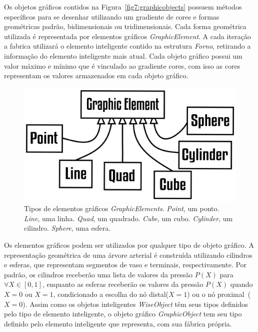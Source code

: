 Os objetos gráficos contidos na Figura~\ref{fig7:graphicobjects} possuem métodos específicos para se desenhar utilizando um gradiente de cores e formas geométricas padrão, bidimensionais ou tridimensionais. Cada forma geométrica utilizada é representada por elementos gráficos \textit{GraphicElement}. A cada iteração  a fabrica utilizará o elemento inteligente contido na estrutura \textit{Forno}, retirando a informação do elemento inteligente mais atual. Cada objeto gráfico possui um valor máximo e mínimo que é vinculado ao gradiente cores, com isso as cores representam os valores armazenados em cada objeto gráfico.

\begin{figure}[!htbp]
	\centering
	\includegraphics[scale=2]{Figures/GraphicElements@16x.png}
	\caption{Tipos de elementos gráficos \textit{GraphicElements}. \textit{Point}, um ponto. \textit{Line}, uma linha. \textit{Quad}, um quadrado. \textit{Cube}, um cubo. \textit{Cylinder}, um cilindro. \textit{Sphere}, uma esfera.}
	\label{fig7:graphicelements}
\end{figure}

Os elementos gráficos podem ser utilizados por qualquer tipo de objeto gráfico. A representação geométrica de uma árvore arterial é construída utilizando cilindros e esferas, que representam segmentos de vaso e terminais, respectivamente. Por padrão, os cilindros receberão uma lista de valores da pressão $P(X)$ para $\forall X \in [0,1]$, enquanto as esferas receberão os valores da pressão $P(X)$ quando $X=0$ ou $X=1$, condicionado a escolha do nó distal($X=1$) ou o nó proximal~($X=0$).  Assim como os objetos inteligentes \textit{WiseObject} têm seus tipos definidos pelo tipo de elemento inteligente, o objeto gráfico \textit{GraphicObject} tem seu tipo definido pelo elemento inteligente que representa, com sua fábrica própria.

